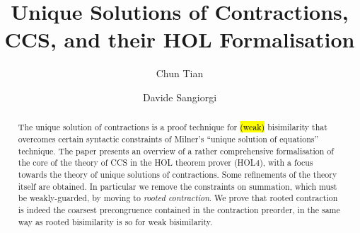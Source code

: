 \documentclass[3p,preprint]{elsarticle}
\begin{document}
\ifrebuttal
{}



\newpage
\setcounter{page}{0}
\fi

\begin{frontmatter}

\title{Unique Solutions of Contractions, CCS, and their HOL
  Formalisation}

\author[mymainaddress]{Chun Tian}%
\address[mymainaddress]{\hl{University of Trento} and Fondazione Bruno
  Kessler, Italy}

\author[mysecondaryaddress]{Davide Sangiorgi}
\address[mysecondaryaddress]{\hl{University of Bologna, Italy and INRIA, France}}

\begin{abstract}
  The unique solution of contractions is a proof technique for
  \hl{(weak)} bisimilarity that overcomes certain syntactic constraints of
  Milner's ``unique solution of equations'' technique.  The paper
  presents an overview of a rather comprehensive formalisation of the
  core of the theory of CCS in the HOL theorem prover (HOL4), with a
  focus towards the theory of unique solutions of contractions.
  Some refinements of the theory itself are obtained.
  In particular we remove the constraints on summation,
  which must be weakly-guarded, by moving to \emph{rooted
  contraction}. We prove that 
 rooted contraction is indeed the coarsest
  precongruence contained in the contraction preorder, in the same way
  as  rooted bisimilarity is  so for weak bisimilarity.


\end{abstract}
\end{frontmatter}
\end{document}
